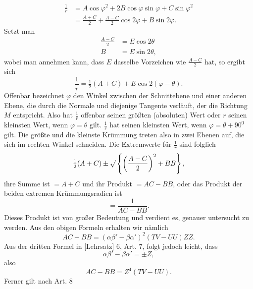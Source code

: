 %
\[
\begin{aligned}
\frac1r&=A\cos\varphi^{2}+2B\cos\varphi\sin\varphi+C\sin\varphi^{2}\\
&=\frac{A+C}{2}+\frac{A-C}{2}\cos2\varphi+B\sin2\varphi.
\end{aligned}
\]
Setzt man
\[
\begin{aligned}
\frac{A-C}{2}&=E\cos2\theta\\
B&=E\sin2\theta,
\end{aligned}
\]
wobei man annehmen kann, dass $E$ dasselbe Vorzeichen wie $\frac{A-C}{2}$ hat, so ergibt sich
\[
\frac1r=\tfrac12(A+C)+E\cos2(\varphi-\theta).
\]
Offenbar bezeichnet $\varphi$ den Winkel zwischen der Schnittebene und einer anderen Ebene, die durch die Normale und diejenige Tangente verläuft, der die Richtung $M$ entspricht. Also hat $\frac1r$ offenbar seinen größten (absoluten) Wert oder $r$ seinen kleinsten Wert, wenn $\varphi=\theta$ gilt. $\frac1r$ hat seinen kleinsten Wert, wenn $\varphi=\theta+90^{0}$ gilt. Die größte und die kleinste Krümmung treten also in zwei Ebenen auf, die sich im rechten Winkel schneiden. Die Extremwerte für $\frac1r$ sind folglich
\[
\tfrac12(A+C)\pm\mathord{\surd}\left\{\left(\frac{A-C}{2}\right)^{2}+BB\right\},
\]
ihre Summe ist $=A+C$ und ihr Produkt $=AC-BB$, oder das Produkt der beiden extremen Krümmungsradien ist
\[
=\frac{1}{AC-BB}.
\]
Dieses Produkt ist von großer Bedeutung und verdient es, genauer untersucht zu werden. Aus den obigen Formeln erhalten wir nämlich
\[
AC-BB=(\alpha\beta'-\beta\alpha')^{2}(TV-UU)ZZ.
\]
Aus der dritten Formel in [Lehrsatz] $6$, Art. $7$, folgt jedoch leicht, dass
\[
\alpha\beta'-\beta\alpha'=\pm Z,
\]
also
\[
AC-BB=Z^{4}(TV-UU).
\]
Ferner gilt nach Art. $8$
